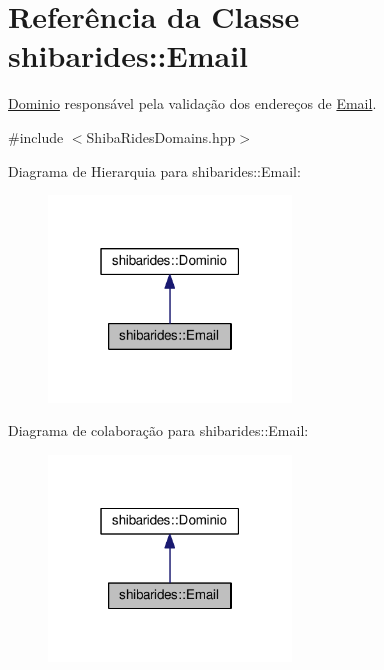 \hypertarget{classshibarides_1_1Email}{}\section{Referência da Classe shibarides\+:\+:Email}
\label{classshibarides_1_1Email}


\hyperlink{classshibarides_1_1Dominio}{Dominio} responsável pela validação dos endereços de \hyperlink{classshibarides_1_1Email}{Email}.  




{\ttfamily \#include $<$Shiba\+Rides\+Domains.\+hpp$>$}



Diagrama de Hierarquia para shibarides\+:\+:Email\+:\nopagebreak
\begin{figure}[H]
\begin{center}
\leavevmode
\includegraphics[width=183pt]{classshibarides_1_1Email__inherit__graph}
\end{center}
\end{figure}


Diagrama de colaboração para shibarides\+:\+:Email\+:\nopagebreak
\begin{figure}[H]
\begin{center}
\leavevmode
\includegraphics[width=183pt]{classshibarides_1_1Email__coll__graph}
\end{center}
\end{figure}
